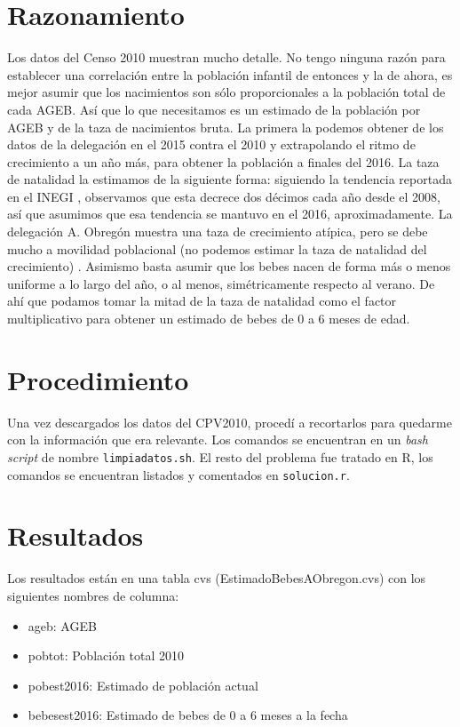\documentclass{article}
\begin{document}
\section{Razonamiento}

Los datos del Censo 2010 muestran mucho detalle. No tengo ninguna razón
para establecer una correlación entre la población infantil de entonces y la de ahora, es mejor asumir que los nacimientos son sólo proporcionales a la población total
de cada AGEB.  Así que lo que necesitamos es un estimado de la población por AGEB y de la taza de nacimientos bruta. La primera la podemos obtener de los datos de la delegación
en el 2015 \cite{CuentameINEGI} contra el 2010 \cite{CPV2010} y extrapolando el ritmo de crecimiento a un año más, para obtener la población a finales del 2016. La taza de natalidad la estimamos de la siguiente forma: siguiendo la tendencia reportada en el INEGI \cite{NatInegi}, observamos que esta decrece dos décimos cada año desde el 2008, así que asumimos que esa tendencia se mantuvo en el 2016, aproximadamente. La delegación A. Obregón muestra una taza de crecimiento atípica, pero se debe mucho a movilidad poblacional (no podemos estimar la taza de natalidad del crecimiento) \cite{AObre}. Asimismo basta asumir que los bebes nacen de forma más o menos uniforme a lo largo del año, o al menos, simétricamente respecto al verano. De ahí que podamos tomar la mitad de la taza de natalidad como el factor multiplicativo para obtener un estimado de bebes de 0 a 6 meses de edad.

\section{Procedimiento}

Una vez descargados los datos del CPV2010, procedí a recortarlos para quedarme con la información que era relevante. Los comandos se encuentran en un \emph{bash script} de nombre  \verb!limpiadatos.sh!. El resto del problema fue tratado en R, los comandos se encuentran listados y comentados en \verb!solucion.r!. 


\section{Resultados}

Los resultados están en una tabla cvs (EstimadoBebesAObregon.cvs) con los siguientes nombres de columna:
\begin{itemize}
\item ageb: AGEB
  \item pobtot: Población total 2010
  \item pobest2016: Estimado de población actual
  \item bebesest2016: Estimado de bebes de 0 a 6 meses a la fecha
\end{itemize}
\end{document}
